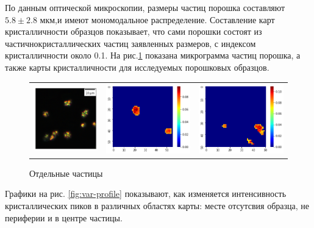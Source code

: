 По данным оптической микроскопии, размеры частиц порошка составляют $5.8\pm 2.8$ мкм,и имеют мономодальное распределение. Составление карт кристалличности образцов показывает, что сами порошки состоят из частичнокристаллических частиц заявленных размеров, с индексом кристалличности около 0.1. На рис.\ref{fig:powder} показана микрограмма частиц порошка, а также карты кристалличности для исследуемых порошковых образцов.


	\begin{figure}[h]
	    \centering
	    \begin{tabular}{ccc}
\includegraphics[width=0.26\linewidth]{fig/powder_optic.png}
&
\includegraphics[width=0.33\linewidth]{fig/1416map.png}
&
\includegraphics[width=0.33\linewidth]{fig/1434map.png}
\end{tabular}
	    \caption{Отдельные частицы}
	    \label{fig:powder}
	\end{figure}
	
Графики на рис. \ref{fig:var-profile} показывают, как изменяется интенсивность кристаллических пиков в различных областях карты: месте отсутсвия образца, не периферии и в центре частицы.

